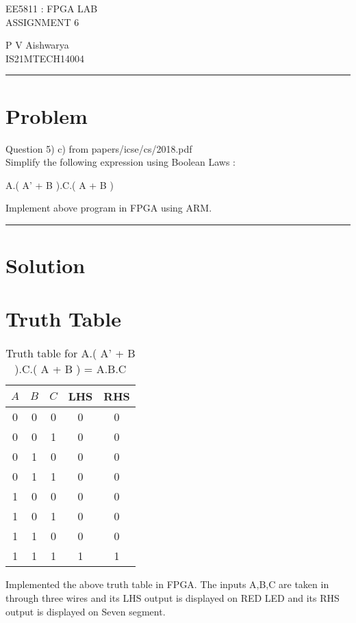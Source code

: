 \documentclass[10pt,a4paper]{article}
\begin{document}
\begin{center}

{\huge EE5811 : FPGA LAB}\\
{\large ASSIGNMENT 6}

\end{center}
P V Aishwarya \\ IS21MTECH14004

\vspace{15pt}
\hrule
\vspace{5pt}


\section*{Problem}

Question 5) c) from papers/icse/cs/2018.pdf\\
Simplify the following expression using Boolean Laws :

\begin{center}
    A.( A' + B ).C.( A + B )
\end{center}

Implement above program in FPGA using ARM.

\vspace{15pt}
\hrule
\vspace{5pt}

\section*{Solution}

\section*{Truth Table}
\begin{table}[h]
    \centering
    \begin{tabular}{|c|c|c|c|c|}
        \hline
        $A$&$B$&$C$&LHS&RHS \\
        \hline
         0&0&0&0&0 \\
         0&0&1&0&0 \\
         0&1&0&0&0 \\
         0&1&1&0&0 \\
         1&0&0&0&0 \\
         1&0&1&0&0 \\
         1&1&0&0&0 \\
         1&1&1&1&1 \\
         \hline
    \end{tabular}
    \caption{Truth table for A.( A' + B ).C.( A + B ) = A.B.C}
    \label{tab:my_label}
\end{table}

Implemented the above truth table in FPGA. The inputs A,B,C are taken in through three wires and its LHS output is displayed on RED LED and its RHS output is displayed on Seven segment.\\
\end{document}
